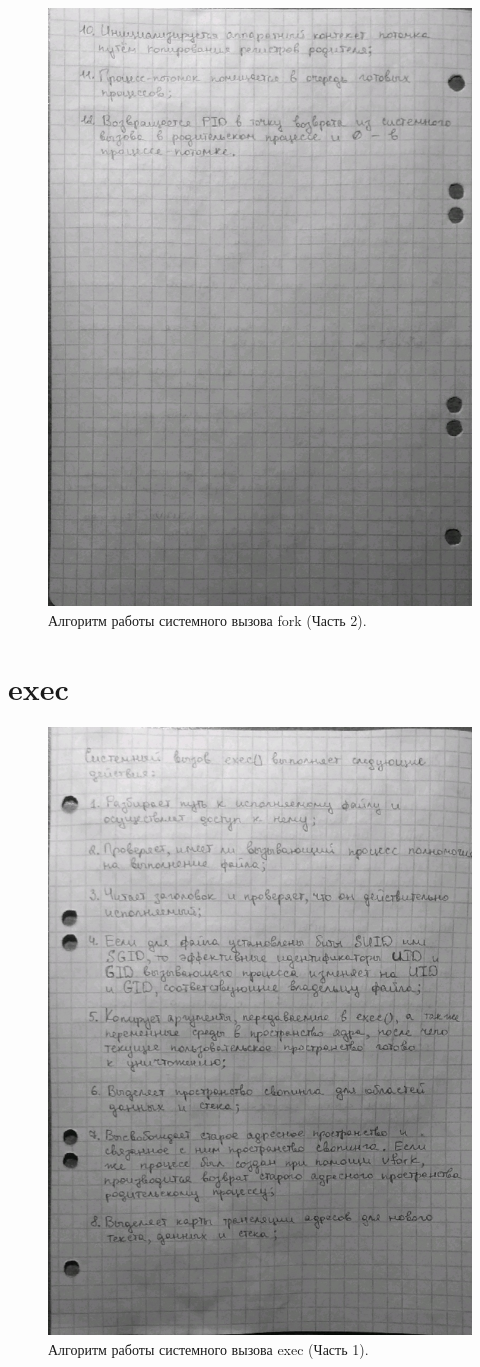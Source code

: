 \begin{figure}[ht]
	\centering
	\includegraphics[width=0.7\linewidth]{img/fork2.jpg}
	\caption{Алгоритм работы системного вызова fork (Часть 2).}
\end{figure}

\clearpage

\section{exec}

\begin{figure}[ht]
	\centering
	\includegraphics[width=0.7\linewidth]{img/exec1.jpg}
	\caption{Алгоритм работы системного вызова exec (Часть 1).}
\end{figure}

